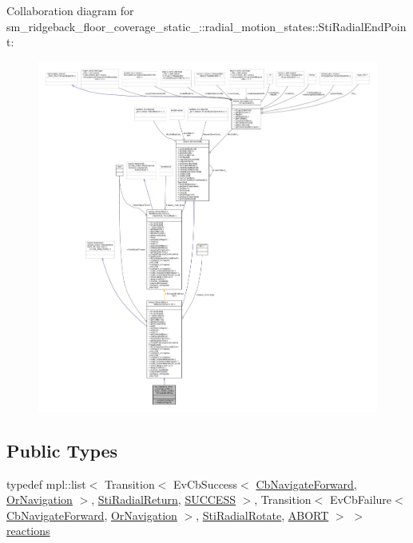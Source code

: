 Collaboration diagram for sm\+\_\+ridgeback\+\_\+floor\+\_\+coverage\+\_\+static\+\_\+:\+:radial\+\_\+motion\+\_\+states\+:\+:Sti\+Radial\+End\+Point\+:
\nopagebreak
\begin{figure}[H]
\begin{center}
\leavevmode
\includegraphics[width=350pt]{structsm__ridgeback__floor__coverage__static__1_1_1radial__motion__states_1_1StiRadialEndPoint__coll__graph}
\end{center}
\end{figure}
\subsection*{Public Types}
\begin{DoxyCompactItemize}
\item 
typedef mpl\+::list$<$ Transition$<$ Ev\+Cb\+Success$<$ \hyperlink{classcl__move__base__z_1_1CbNavigateForward}{Cb\+Navigate\+Forward}, \hyperlink{classsm__ridgeback__floor__coverage__static__1_1_1OrNavigation}{Or\+Navigation} $>$, \hyperlink{structsm__ridgeback__floor__coverage__static__1_1_1radial__motion__states_1_1StiRadialReturn}{Sti\+Radial\+Return}, \hyperlink{structsmacc_1_1default__transition__tags_1_1SUCCESS}{S\+U\+C\+C\+E\+SS} $>$, Transition$<$ Ev\+Cb\+Failure$<$ \hyperlink{classcl__move__base__z_1_1CbNavigateForward}{Cb\+Navigate\+Forward}, \hyperlink{classsm__ridgeback__floor__coverage__static__1_1_1OrNavigation}{Or\+Navigation} $>$, \hyperlink{structsm__ridgeback__floor__coverage__static__1_1_1radial__motion__states_1_1StiRadialRotate}{Sti\+Radial\+Rotate}, \hyperlink{structsmacc_1_1default__transition__tags_1_1ABORT}{A\+B\+O\+RT} $>$ $>$ \hyperlink{structsm__ridgeback__floor__coverage__static__1_1_1radial__motion__states_1_1StiRadialEndPoint_a112bf52f08cf09de3e8e62847cafe5c8}{reactions}
\end{DoxyCompactItemize}
